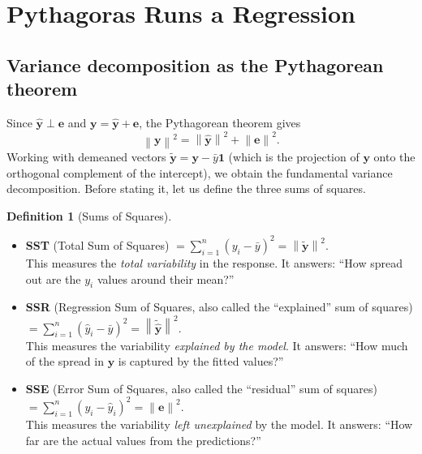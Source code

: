 \documentclass[11pt,a4paper]{article}
\theoremstyle{plain}
\theoremstyle{definition}
\newtheorem{definition}[theorem]{Definition}
\newcommand{\yhat}{\hat{\bm{y}}}
\newcommand{\by}{\bm{y}}
\newcommand{\be}{\bm{e}}
\newcommand{\norm}[1]{\left\lVert #1 \right\rVert}
\begin{document}
\section{Pythagoras Runs a Regression}\label{sec:pythagoras}

\subsection{Variance decomposition as the Pythagorean theorem}

Since $\yhat\perp\be$ and $\by = \yhat + \be$, the Pythagorean theorem gives
\begin{equation}\label{eq:pythag}
  \norm{\by}^2 = \norm{\yhat}^2 + \norm{\be}^2.
\end{equation}
Working with demeaned vectors $\tilde{\by}=\by-\bar{y}\bm{1}$
(which is the projection of $\by$ onto the orthogonal complement of
the intercept), we obtain the fundamental variance decomposition.
Before stating it, let us define the three sums of squares.

\begin{definition}[Sums of Squares]\label{def:sums-of-squares}
\leavevmode
\begin{itemize}[nosep]
  \item \textbf{SST} (Total Sum of Squares) $= \sum_{i=1}^n (y_i - \bar{y})^2 = \norm{\tilde{\by}}^2$.\\
    This measures the \emph{total variability} in the response.
    It answers: ``How spread out are the $y_i$ values around their mean?''
  \item \textbf{SSR} (Regression Sum of Squares, also called the ``explained'' sum of squares) $= \sum_{i=1}^n (\hat{y}_i - \bar{y})^2 = \norm{\tilde{\yhat}}^2$.\\
    This measures the variability \emph{explained by the model}.
    It answers: ``How much of the spread in $\by$ is captured by the fitted values?''
  \item \textbf{SSE} (Error Sum of Squares, also called the ``residual'' sum of squares) $= \sum_{i=1}^n (y_i - \hat{y}_i)^2 = \norm{\be}^2$.\\
    This measures the variability \emph{left unexplained} by the model.
    It answers: ``How far are the actual values from the predictions?''
\end{itemize}
\end{definition}
\end{document}
